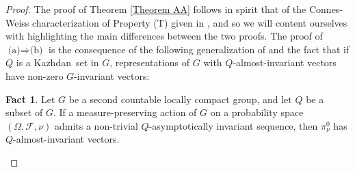 \documentclass[11pt,english,a4paper]{smfart}
\numberwithin{equation}{section}
\theoremstyle{definition}
\newtheorem{fact}[theorem]{Fact}
\begin{document}
\begin{proof}
 The proof of Theorem \ref{Theorem AA} follows in spirit that of the Connes-Weiss characterization of Property (T) given in \cite[Th.~6.3.4]{BdHV}, and so we will content ourselves with highlighting the main differences between the two proofs.
The proof of $\textrm{(a)}\Longrightarrow\textrm{(b)}$ is the consequence of the following generalization of \cite[Prop.~6.3.2]{BdHV} and the fact that if ${Q}$ is a {Kazhdan}\ set in $G$, representations of $G$ with ${Q}$-almost-invariant vectors have non-zero  $G$-invariant vectors:

\begin{fact}\label{Fact BB}
 Let $G$ be a second countable locally compact group, and let ${Q}$ be a subset of $G$. If a measure-preserving action of $G$ on a probability space $(\Omega ,\mathcal{F},\nu )$ admits a non-trivial ${Q}$-asymptotically invariant sequence, then $\pi _{\nu }^{0}$ has ${Q}$-almost-invariant vectors.
\end{fact}


\end{proof}
\end{document}
